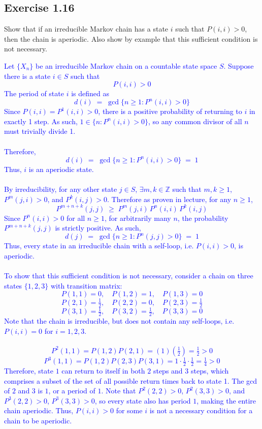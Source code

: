 \documentclass{article}
\begin{document}
\subsection*{Exercise 1.16} Show that if an irreducible Markov chain has a state $i$ such that $P(i, i) > 0$, then the chain
is aperiodic. Also show by example that this sufficient condition is not necessary.

\textcolor{blue}{
Let $\{X_n\}$ be an irreducible Markov chain on a countable state space $S$. Suppose there is a state $i \in S$ such that
\[
    P(i,i) > 0
\]
The period of state $i$ is defined as
\[
    d(i) \;=\; \gcd \{ n \ge 1 : P^n(i,i) > 0 \}
\]
Since $P(i,i) = P^1(i,i)> 0$, there is a positive probability of returning to $i$ in exactly 1 step. As such, $1 \in \{n: P^n(i,i) > 0\}$, so any common divisor of all $n$ must trivially divide 1. \\ \\ Therefore,
\[
    d(i) \;=\; \gcd \{ n \ge 1 : P^n(i,i) > 0 \} \;=\; 1
\]
Thus, $i$ is an aperiodic state. \\ \\ 
By irreducibility, for any other state $j \in S$, $\exists m,k \in \mathbb{Z}$ such that $ m,k\ge 1$, $P^m(j,i) > 0$, and $P^k(i,j) > 0$. Therefore as proven in lecture, for any $n \ge 1$,
\[
    P^{m+n+k}(j,j) 
    \;\ge\; P^m(j,i) \, P^n(i,i) \, P^k(i,j)
\]
Since $P^n(i,i) > 0$ for all $n \ge 1$, for arbitrarily many $n$, the probability $P^{m+n+k}(j,j)$ is strictly positive. As such,
\[
    d(j) \;=\; \gcd\{ n \ge 1 : P^n(j,j) > 0 \} \;=\; 1
\]
Thus, every state in an irreducible chain with a self-loop, i.e. $P(i,i) > 0$, is aperiodic. \\ \\ 
To show that this sufficient condition is not necessary, consider a chain on three states $\{1,2,3\}$ with transition matrix:
\[
    P(1,1)=0, \quad P(1,2)=1, \quad P(1,3)=0 
\]
\[
    P(2,1)=\tfrac{1}{2}, \quad P(2,2)=0, \quad P(2,3)=\tfrac{1}{2}
\]
\[
    P(3,1)=\tfrac{1}{2}, \quad P(3,2)=\tfrac{1}{2}, \quad P(3,3)=0
\]
Note that the chain is irreducible, but does not contain any self-loops, i.e. $P(i,i)=0$ for $i=1,2,3$. \\ \\ 
\[
    P^2(1,1) = P(1,2)P(2,1) = (1)\left(\tfrac{1}{2}\right) = \tfrac{1}{2} > 0
\]
\[
    P^3(1,1) = P(1,2)P(2,3)P(3,1) = 1 \cdot \tfrac{1}{2} \cdot \tfrac{1}{2}
    = \tfrac{1}{4} > 0
\]
Therefore, state $1$ can return to itself in both $2$ steps and $3$ steps, which comprises a subset of the set of all possible return times back to state 1. The gcd of $2$ and $3$ is $1$, or a period of $1$. 
Note that $P^2(2,2)>0$, $P^2(3,3)>0$, and $P^3(2,2)>0$, $P^3(3,3)>0$, so every state also has period $1$, making the entire chain aperiodic.
Thus, $P(i,i) > 0$ for some $i$ is not a necessary condition for a chain to be aperiodic.
}
\end{document}
